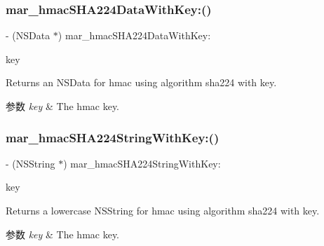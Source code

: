 \subsubsection{\texorpdfstring{mar\+\_\+hmac\+S\+H\+A224\+Data\+With\+Key\+:()}{mar\_hmacSHA224DataWithKey:()}}
{\footnotesize\ttfamily -\/ (N\+S\+Data $\ast$) mar\+\_\+hmac\+S\+H\+A224\+Data\+With\+Key\+: \begin{DoxyParamCaption}\item[{(N\+S\+Data $\ast$)}]{key }\end{DoxyParamCaption}}

Returns an N\+S\+Data for hmac using algorithm sha224 with key. 
\begin{DoxyParams}{参数}
{\em key} & The hmac key. \\
\hline
\end{DoxyParams}
\mbox{\label{category_n_s_data_07_m_a_r_e_x_08_ab24c3cc0680ab46e4e102fde09e5741f}} 
\subsubsection{\texorpdfstring{mar\+\_\+hmac\+S\+H\+A224\+String\+With\+Key\+:()}{mar\_hmacSHA224StringWithKey:()}}
{\footnotesize\ttfamily -\/ (N\+S\+String $\ast$) mar\+\_\+hmac\+S\+H\+A224\+String\+With\+Key\+: \begin{DoxyParamCaption}\item[{(N\+S\+String $\ast$)}]{key }\end{DoxyParamCaption}}

Returns a lowercase N\+S\+String for hmac using algorithm sha224 with key. 
\begin{DoxyParams}{参数}
{\em key} & The hmac key. \\
\hline
\end{DoxyParams}
\mbox{\label{category_n_s_data_07_m_a_r_e_x_08_a512511db285cd847255112b73726672a}} 
